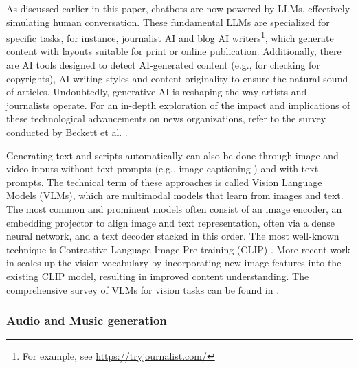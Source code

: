 \documentclass[11pt,a4paper]{article}
\begin{document}
As discussed earlier in this paper, chatbots are now powered by LLMs, effectively simulating human conversation. These fundamental LLMs are specialized for specific tasks, for instance, journalist AI and blog AI writers\footnote{For example, see \url{https://tryjournalist.com/}}, which generate content with layouts suitable for print or online publication. Additionally, there are AI tools designed to detect AI-generated content (e.g., for checking for copyrights), AI-writing styles and content originality to ensure the natural sound of articles. Undoubtedly, generative AI is reshaping the way artists and journalists operate. For an in-depth exploration of the impact and implications of these technological advancements on news organizations, refer to the survey conducted by Beckett et al. \cite{Beckett:Generating:2023}.

Generating text and scripts automatically can also be done through image and video inputs without text prompts (e.g., image captioning \cite{Stefanini:From:2023}) and with text prompts. The technical term of these approaches is called Vision Language Models (VLMs), which are  multimodal models that learn from images and text. The most common and prominent models often consist of an image encoder, an embedding projector to align image and text representation, often via a dense neural network, and a text decoder stacked in this order. The most well-known technique is Contrastive Language-Image Pre-training (CLIP) \cite{radford2021learning}. More recent work in \cite{wei2024vary} scales up the vision vocabulary by incorporating new image features into the existing CLIP model, resulting in improved content understanding. The comprehensive survey of VLMs for vision tasks can be found in \cite{Zhang:vision:2024}.

\subsubsection{Audio and Music generation}
\label{sssec:musicgen}
\end{document}
